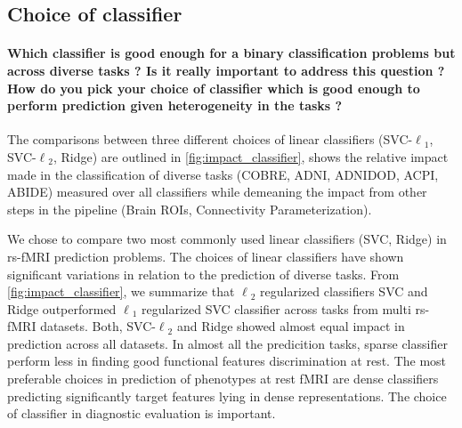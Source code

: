 \documentclass[5p]{elsarticle}
\begin{document}
 \subsection{Choice of classifier}
 \paragraph{Which classifier is good enough for a binary classification
     problems but across diverse tasks ? Is it really important to address
     this question ? How do you pick your choice of classifier which
     is good enough to perform prediction given heterogeneity in the tasks ?}

     The comparisons between three different choices of linear classifiers
     (SVC-$\ell{_1}$, SVC-$\ell{_2}$, Ridge) are outlined in
     \autoref{fig:impact_classifier}, shows the relative impact made in the
     classification of diverse tasks (COBRE, ADNI, ADNIDOD, ACPI, ABIDE) measured
     over all classifiers while demeaning the impact from other steps in the
     pipeline (Brain ROIs, Connectivity Parameterization).

     We chose to compare two most commonly used linear classifiers
     (SVC, Ridge) in rs-fMRI prediction problems.
     The choices of linear classifiers have shown significant variations in
     relation to the prediction of diverse tasks.
     From \autoref{fig:impact_classifier}, we summarize that $\ell{_2}$
     regularized classifiers SVC and Ridge outperformed $\ell{_1}$ regularized
     SVC classifier across tasks from multi rs-fMRI datasets. Both,
     SVC-$\ell{_2}$ and Ridge showed almost equal impact in prediction across all
     datasets. In almost all the predicition tasks, sparse classifier perform
     less in finding good functional features discrimination at rest.
     The most preferable choices in prediction of phenotypes at rest fMRI are
     dense classifiers predicting significantly target features lying in dense
     representations. The choice of classifier in diagnostic evaluation is
     important.
\end{document}
